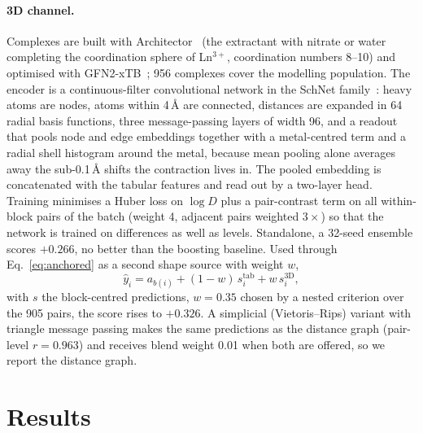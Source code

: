 \documentclass{article}
\begin{document}
\paragraph{3D channel.}
Complexes are built with Architector~\cite{taylor2023architector} (the extractant with nitrate or water completing the coordination sphere of Ln$^{3+}$, coordination numbers 8--10) and optimised with GFN2-xTB~\cite{bannwarth2019gfn2}; 956 complexes cover the modelling population.
The encoder is a continuous-filter convolutional network in the SchNet family~\cite{schutt2017schnet}: heavy atoms are nodes, atoms within 4\,\AA{} are connected, distances are expanded in 64 radial basis functions, three message-passing layers of width 96, and a readout that pools node and edge embeddings together with a metal-centred term and a radial shell histogram around the metal, because mean pooling alone averages away the sub-0.1\,\AA{} shifts the contraction lives in.
The pooled embedding is concatenated with the tabular features and read out by a two-layer head.
Training minimises a Huber loss on $\log D$ plus a pair-contrast term on all within-block pairs of the batch (weight 4, adjacent pairs weighted $3\times$) so that the network is trained on differences as well as levels.
Standalone, a 32-seed ensemble scores $+0.266$, no better than the boosting baseline.
Used through Eq.~\eqref{eq:anchored} as a second shape source with weight $w$,
\[
	\hat y_i = a_{b(i)} + (1-w)\, s^{\mathrm{tab}}_i + w\, s^{\mathrm{3D}}_i ,
\]
with $s$ the block-centred predictions, $w = 0.35$ chosen by a nested criterion over the 905 pairs, the score rises to $+0.326$.
A simplicial (Vietoris--Rips) variant with triangle message passing makes the same predictions as the distance graph (pair-level $r = 0.963$) and receives blend weight 0.01 when both are offered, so we report the distance graph.

\section{Results}
\label{sec:results}
\end{document}
